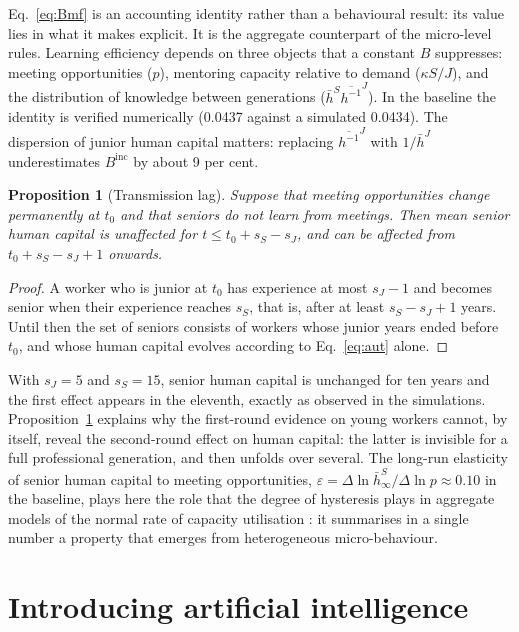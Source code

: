 \documentclass[preprint,12pt,authoryear]{elsarticle}
\newtheorem{proposition}{Proposition}
\begin{document}
Eq.~\eqref{eq:Bmf} is an accounting identity rather than a behavioural result: its value lies in what it makes explicit. It is the aggregate counterpart of the micro-level rules. Learning efficiency depends on three objects that a constant $B$ suppresses: meeting opportunities ($p$), mentoring capacity relative to demand ($\kappa S/J$), and the distribution of knowledge between generations ($\bar h^S \overline{h^{-1}}^J$). In the baseline the identity is verified numerically (0.0437 against a simulated 0.0434). The dispersion of junior human capital matters: replacing $\overline{h^{-1}}^J$ with $1/\bar h^J$ underestimates $B^{\mathrm{inc}}$ by about 9 per cent.

\begin{proposition}[Transmission lag]\label{prop:lag}
Suppose that meeting opportunities change permanently at $t_0$ and that seniors do not learn from meetings. Then mean senior human capital is unaffected for $t \le t_0 + s_S - s_J$, and can be affected from $t_0 + s_S - s_J + 1$ onwards.
\end{proposition}
\begin{proof}
A worker who is junior at $t_0$ has experience at most $s_J-1$ and becomes senior when their experience reaches $s_S$, that is, after at least $s_S-s_J+1$ years. Until then the set of seniors consists of workers whose junior years ended before $t_0$, and whose human capital evolves according to Eq.~\eqref{eq:aut} alone.
\end{proof}

With $s_J=5$ and $s_S=15$, senior human capital is unchanged for ten years and the first effect appears in the eleventh, exactly as observed in the simulations. Proposition~\ref{prop:lag} explains why the first-round evidence on young workers \citep{Brynjolfsson2025} cannot, by itself, reveal the second-round effect on human capital: the latter is invisible for a full professional generation, and then unfolds over several. The long-run elasticity of senior human capital to meeting opportunities, $\varepsilon = \Delta \ln \bar h^S_\infty / \Delta\ln p \approx 0.10$ in the baseline, plays here the role that the degree of hysteresis plays in aggregate models of the normal rate of capacity utilisation \citep{Bassi2022}: it summarises in a single number a property that emerges from heterogeneous micro-behaviour.

\section{Introducing artificial intelligence}\label{sec:ai}
\end{document}
